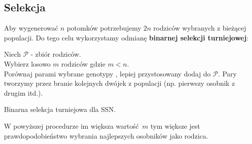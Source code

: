 \documentclass{article}
\begin{document}
\subsection{Selekcja}
Aby wygenerować $n$ potomków potrzebujemy $2n$ rodziców wybranych z bieżącej populacji.
Do tego celu wykorzystamy odmianę \textbf{binarnej selekcji turniejowej}:\\
\begin{algorithm}[H]
 Niech $\mathcal{P}$ - zbiór rodziców.\\
 Wybierz losowo $m$ rodziców gdzie $m < n$.\\
  {
	Porównaj parami wybrane genotypy , lepiej przystosowany dodaj do $\mathcal{P}$.
	Pary tworzymy przez branie kolejnych dwójek z populacji (np. pierwszy osobnik z 
	drugim itd.).
 }
 \caption{Binarna selekcja turniejowa dla SSN.}
\end{algorithm}
W powyższej procedurze im większa wartość $m$ tym większe jest prawdopodobieństwo wybrania
najlepszych osobników jako rodzica.
\end{document}

